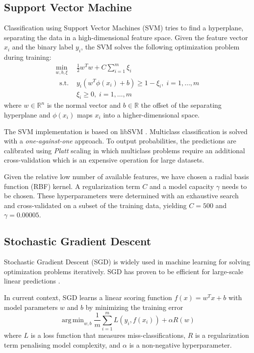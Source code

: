 \documentclass[journal]{IEEEtran}
\DeclareMathOperator*{\argmin}{arg\,min}
\begin{document}
\subsection{Support Vector Machine}
Classification using Support Vector Machines (SVM) tries to find a hyperplane, separating the data in a high-dimensional feature space. Given the feature vector $x_i$ and the binary label $y_i$, the SVM solves the following optimization problem during training:
\begin{equation}
\begin{split}
\min_{w, b, \xi} \ & \frac{1}{2}w^Tw + C\sum_{i=1}^m \xi_i \\
\ \text{ s.t. } & y_i(w^T\phi(x_i)+b) \geq 1-\xi_i, \; i = 1, \ldots, m \\
& \xi_i \geq 0, \; i = 1, \ldots, m
\end{split}
\end{equation}
where $w\in \mathbb{R}^n $ is the normal vector and $b \in \mathbb{R}$ the offset of the separating hyperplane and $\phi(x_i)$ maps $x_i$ into a higher-dimensional space.

The SVM implementation is based on libSVM \cite{chang2011libsvm}. Multiclass classification is solved with a \textit{one-against-one} approach. To output probabilities, the predictions are calibrated using \textit{Platt} scaling in which multiclass problems require an additional cross-validation which is an expensive operation for large datasets.

Given the relative low number of available features, we have chosen a radial basis function (RBF) kernel. A regularization term $C$ and a model capacity $\gamma$ needs to be chosen. These hyperparameters were determined with an exhaustive search and cross-validated on a subset of the training data, yielding $C=500$ and $\gamma=0.00005$.

\subsection{Stochastic Gradient Descent}
Stochastic Gradient Descent (SGD) is widely used in machine learning for solving optimization problems iteratively. SGD has proven to be efficient for large-scale linear predictions \cite{zhang2004solving}.

In current context, SGD learns a linear scoring function $f(x) = w^Tx + b$ with model parameters $w$ and $b$ by minimizing the training error
\begin{equation}
\argmin_{w,b} \frac{1}{m}\sum_{i=1}^mL(y_i, f(x_i)) + \alpha R(w)
\end{equation}
where $L$ is a loss function that measures miss-classifications, $R$ is a regularization term penalising model complexity, and $\alpha$ is a non-negative hyperparameter.
\end{document}
